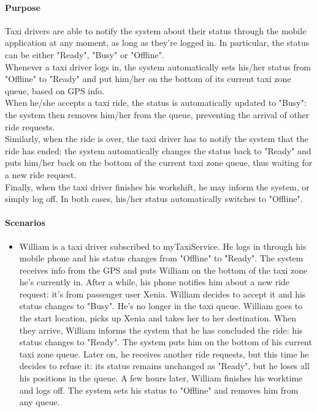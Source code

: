 	\paragraph{Purpose}
		Taxi drivers are able to notify the system about their status through the mobile application at any moment, as long as they're logged in. In particular, the status can be either "Ready", "Busy" or "Offline".\\
		Whenever a taxi driver logs in, the system automatically sets his/her status from "Offline" to "Ready" and put him/her on the bottom of its current taxi zone queue, based on GPS info.\\
		When he/she accepts a taxi ride, the status is automatically updated to "Busy": the system then removes him/her from the queue, preventing the arrival of other ride requests.\\
		Similarly, when the ride is over, the taxi driver has to notify the system that the ride has ended: the system automatically changes the status back to "Ready" and puts him/her back on the bottom of the current taxi zone queue, thus waiting for a new ride request.\\
		Finally, when the taxi driver finishes his workshift, he may inform the system, or simply log off. In both cases, his/her status automatically switches to "Offline".

	\paragraph{Scenarios}
		\begin{itemize}
			\item William is a taxi driver subscribed to myTaxiService. He logs in through his mobile phone and his status changes from "Offline" to "Ready". The system receives info from the GPS and puts William on the bottom of the taxi zone he's currently in. After a while, his phone notifies him about a new ride request: it's from passenger user Xenia. William decides to accept it and his status changes to "Busy". He's no longer in the taxi queue. William goes to the start location, picks up Xenia and takes her to her destination. When they arrive, William informs the system that he has concluded the ride: his status changes to "Ready". The system puts him on the bottom of his current taxi zone queue. Later on, he receives another ride requests, but this time he decides to refuse it: its status remains unchanged as "Ready", but he loses all his positions in the queue. A few hours later, William finishes his worktime and logs off. The system sets his status to "Offline" and removes him from any queue.
		\end{itemize}
	
